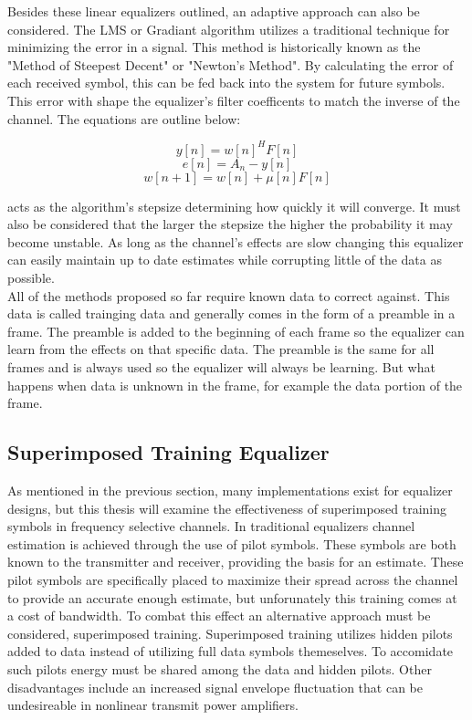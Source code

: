 \documentclass[11pt]{mvlthesis}
\begin{document}
Besides these linear equalizers outlined, an adaptive approach can also be considered.  The LMS or Gradiant algorithm utilizes a traditional technique for minimizing the error in a signal.  This method is historically known as the "Method of Steepest Decent" or "Newton's Method". By calculating the error of each received symbol, this can be fed back into the system for future symbols.  This error with shape the equalizer's filter coefficents to match the inverse of the channel.  The equations are outline below:

\[ y[n]=w[n]^{H}F[n]\]
\[ e[n]=A_{n}-y[n]\]
\[ w[n+1]=w[n]+\mu[n]F[n]\] 

\mu acts as the algorithm's stepsize determining how quickly it will converge.  It must also be considered that the larger the stepsize the higher the probability it may become unstable.  As long as the channel's effects are slow changing this equalizer can easily maintain up to date estimates while corrupting little of the data as possible.\\  

All of the methods proposed so far require known data to correct against.  This data is called trainging data and generally comes in the form of a preamble in a frame.  The preamble is added to the beginning of each frame so the equalizer can learn from the effects on that specific data.  The preamble is the same for all frames and is always used so the equalizer will always be learning.  But what happens when data is unknown in the frame, for example the data portion of the frame.\\


\subsection{Superimposed Training Equalizer}

As mentioned in the previous section, many implementations exist for equalizer designs, but this thesis will examine the effectiveness of superimposed training symbols in frequency selective channels.  In traditional equalizers channel estimation is achieved through the use of pilot symbols.  These symbols are both known to the transmitter and receiver, providing the basis for an estimate.  These pilot symbols are specifically placed to maximize their spread across the channel to provide an accurate enough estimate, but unforunately this training comes at a cost of bandwidth\cite{16}.  To combat this effect an alternative approach must be considered, superimposed training.  Superimposed training utilizes hidden pilots added to data instead of utilizing full data symbols themeselves.  To accomidate such pilots energy must be shared among the data and hidden pilots\cite{15}.  Other disadvantages include an increased signal envelope fluctuation that can be undesireable in nonlinear transmit power amplifiers\cite{17}.\\  
\end{document}
